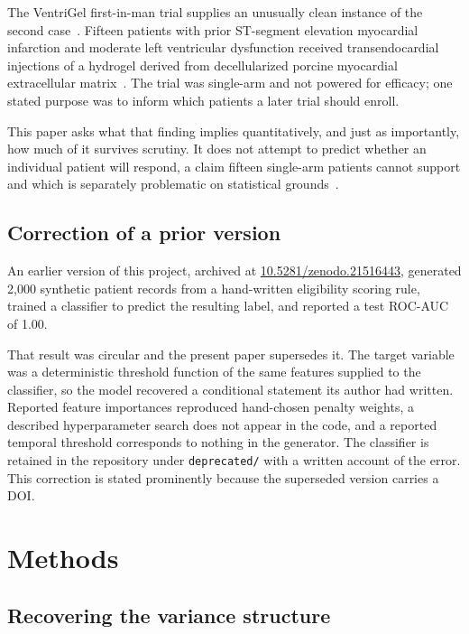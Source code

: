 \documentclass[10pt,twocolumn,letterpaper]{article}
\begin{document}
The VentriGel first-in-man trial supplies an unusually clean instance of the second
case~\cite{traverse2019}. Fifteen patients with prior ST-segment elevation myocardial infarction and
moderate left ventricular dysfunction received transendocardial injections of a hydrogel derived
from decellularized porcine myocardial extracellular matrix~\cite{singelyn2009, seifnaraghi2013}.
The trial was single-arm and not powered for efficacy; one stated purpose was to inform which
patients a later trial should enroll.

This paper asks what that finding implies quantitatively, and just as importantly, how much of it
survives scrutiny. It does not attempt to predict whether an individual patient will respond, a
claim fifteen single-arm patients cannot support and which is separately problematic on statistical
grounds~\cite{senn2004}.

\subsection{Correction of a prior version}

An earlier version of this project, archived at
\href{https://doi.org/10.5281/zenodo.21516443}{10.5281/zenodo.21516443}, generated 2{,}000 synthetic
patient records from a hand-written eligibility scoring rule, trained a classifier to predict the
resulting label, and reported a test ROC-AUC of 1.00.

That result was circular and the present paper supersedes it. The target variable was a
deterministic threshold function of the same features supplied to the classifier, so the model
recovered a conditional statement its author had written. Reported feature importances reproduced
hand-chosen penalty weights, a described hyperparameter search does not appear in the code, and a
reported temporal threshold corresponds to nothing in the generator. The classifier is retained in
the repository under \texttt{deprecated/} with a written account of the error. This correction is
stated prominently because the superseded version carries a DOI.

\section{Methods}

\subsection{Recovering the variance structure}
\end{document}
